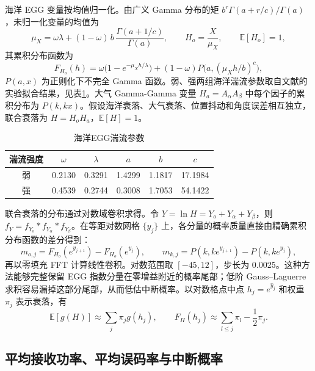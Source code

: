 海洋 EGG 变量按均值归一化。由广义 Gamma 分布的矩 $b^r\Gamma(a+r/c)/\Gamma(a)$，未归一化变量的均值为
\begin{equation}
\mu_X=\omega\lambda+(1-\omega)\,b\,\frac{\Gamma(a+1/c)}{\Gamma(a)},\qquad H_o=\frac{X}{\mu_X},\qquad \mathbb E[H_o]=1,
\label{eq:c5_egg_mean}
\end{equation}
其累积分布函数为
\begin{equation}
F_{H_o}(h)=\omega\big(1-e^{-\mu_Xh/\lambda}\big)+(1-\omega)P\big(a,(\mu_Xh/b)^c\big),
\label{eq:c5_egg_cdf}
\end{equation}
$P(a,x)$ 为正则化下不完全 Gamma 函数。弱、强两组海洋湍流参数取自文献\cite{zedini2020egg}的实验拟合结果，见表\ref{tab:c5_egg}。大气 Gamma-Gamma 变量 $H_a=A_\alpha A_\beta$ 中每个因子的累积分布为 $P(k,kx)$。假设海洋衰落、大气衰落、位置抖动和角度误差相互独立，联合衰落为 $H=H_oH_a$，$\mathbb E[H]=1$。

\begin{table}[htbp]
\caption{海洋EGG湍流参数}
\label{tab:c5_egg}
\centering
\begin{tabular}{cccccc}
\toprule
湍流强度 & $\omega$ & $\lambda$ & $a$ & $b$ & $c$ \\
\midrule
弱 & 0.2130 & 0.3291 & 1.4299 & 1.1817 & 17.1984 \\
强 & 0.4539 & 0.2744 & 0.3008 & 1.7053 & 54.1422 \\
\bottomrule
\end{tabular}
\end{table}

联合衰落的分布通过对数域卷积求得。令 $Y=\ln H=Y_o+Y_\alpha+Y_\beta$，则 $f_Y=f_{Y_o}*f_{Y_\alpha}*f_{Y_\beta}$。在等距对数网格 $\{y_j\}$ 上，各分量的概率质量直接由精确累积分布函数的差分得到：
\begin{equation}
m_{o,j}=F_{H_o}(e^{y_{j+1}})-F_{H_o}(e^{y_j}),\qquad
m_{k,j}=P(k,ke^{y_{j+1}})-P(k,ke^{y_j}),
\label{eq:c5_mass}
\end{equation}
再以零填充 FFT 计算线性卷积。对数范围取 $[-45,12]$，步长为 0.0025。这种方法能够完整保留 EGG 指数分量在零增益附近的概率尾部；低阶 Gauss--Laguerre 求积容易漏掉这部分尾部，从而低估中断概率。以对数格点中点 $h_j=e^{\hat y_j}$ 和权重 $\pi_j$ 表示衰落，有
\begin{equation}
\mathbb E[g(H)]\approx\sum_j\pi_jg(h_j),\qquad F_H(h_j)\approx\sum_{l\le j}\pi_l-\frac12\pi_j.
\label{eq:c5_fading_quad}
\end{equation}

\subsection{平均接收功率、平均误码率与中断概率}

